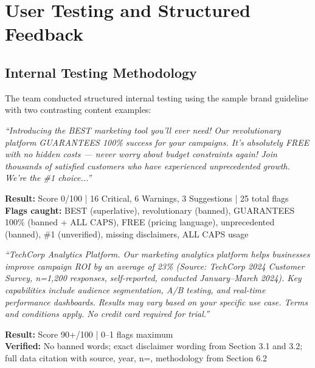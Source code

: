 \documentclass[11pt,a4paper]{article}
\begin{document}
\section{User Testing and Structured Feedback}

\subsection{Internal Testing Methodology}

The team conducted structured internal testing using the sample brand guideline with two contrasting content examples:

\begin{tcolorbox}[colback=dangerred!10, colframe=dangerred, arc=2mm, boxrule=0.5pt, title=\textbf{Non-Compliant Content Test (Expected: score $<$ 50)}]
\textit{``Introducing the BEST marketing tool you'll ever need! Our revolutionary platform GUARANTEES 100\% success for your campaigns. It's absolutely FREE with no hidden costs --- never worry about budget constraints again! Join thousands of satisfied customers who have experienced unprecedented growth. We're the \#1 choice...''}

\textbf{Result:} Score 0/100 | 16 Critical, 6 Warnings, 3 Suggestions | 25 total flags\\
\textbf{Flags caught:} BEST (superlative), revolutionary (banned), GUARANTEES 100\% (banned + ALL CAPS), FREE (pricing language), unprecedented (banned), \#1 (unverified), missing disclaimers, ALL CAPS usage
\end{tcolorbox}

\vspace{0.5cm}

\begin{tcolorbox}[colback=successgreen!10, colframe=successgreen, arc=2mm, boxrule=0.5pt, title=\textbf{Compliant Content Test (Expected: score $\geq$ 85)}]
\textit{``TechCorp Analytics Platform. Our marketing analytics platform helps businesses improve campaign ROI by an average of 23\% (Source: TechCorp 2024 Customer Survey, n=1,200 responses, self-reported, conducted January--March 2024). Key capabilities include audience segmentation, A/B testing, and real-time performance dashboards. Results may vary based on your specific use case. Terms and conditions apply. No credit card required for trial.''}

\textbf{Result:} Score 90+/100 | 0--1 flags maximum\\
\textbf{Verified:} No banned words; exact disclaimer wording from Section 3.1 and 3.2; full data citation with source, year, n=, methodology from Section 6.2
\end{tcolorbox}
\end{document}
